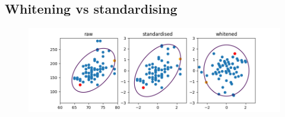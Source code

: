 \documentclass{article}
\begin{document}
\subsection{Whitening vs standardising}
\begin{figure}[h]
\centering
\includegraphics[width=\linewidth]{4-gaussian-models/48-whiten-stdise}
\end{figure}

\end{document}
